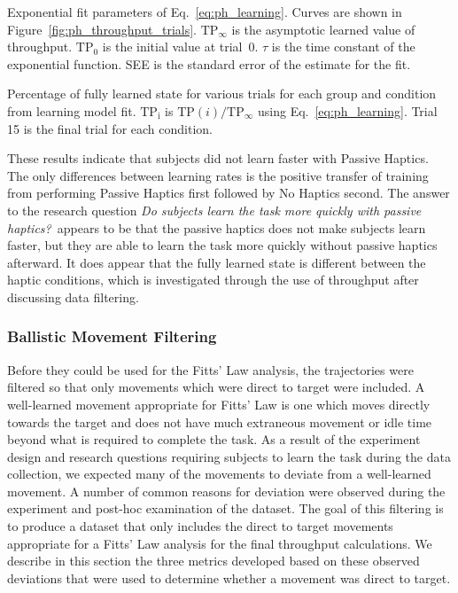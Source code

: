 \begin{table}
    \centering
    \caption{Exponential fit parameters of Eq.~\ref{eq:ph_learning}. Curves are shown in Figure~\ref{fig:ph_throughput_trials}. $\mathrm{TP}_{\infty}$ is the asymptotic learned value of throughput. $\mathrm{TP}_0$ is the initial value at trial~0. $\tau$ is the time constant of the exponential function. SEE is the standard error of the estimate for the fit.}
    \label{tab:ph_tp_regression}
\end{table}

\begin{table}
    \centering
    \caption{Percentage of fully learned state for various trials for each group and condition from learning model fit. $\mathrm{TP_i}$ is $\mathrm{TP}(i)/\mathrm{TP}_{\infty}$ using Eq.~\ref{eq:ph_learning}. Trial 15 is the final trial for each condition.}
    \label{tab:ph_tp_regression_values}
\end{table}

These results indicate that subjects did not learn faster with Passive Haptics.
The only differences between learning rates is the positive transfer of training from performing Passive Haptics first followed by No Haptics second.
The answer to the research question \textit{Do subjects learn the task more quickly with passive haptics?}\ appears to be that the passive haptics does not make subjects learn faster, but they are able to learn the task more quickly without passive haptics afterward.
It does appear that the fully learned state is different between the haptic conditions, which is investigated through the use of throughput after discussing data filtering.

\subsubsection{Ballistic Movement Filtering}
\label{sec:ph_ballistic_filter}

Before they could be used for the Fitts' Law analysis, the trajectories were filtered so that only movements which were direct to target were included.
A well-learned movement appropriate for Fitts' Law is one which moves directly towards the target and does not have much extraneous movement or idle time beyond what is required to complete the task.
As a result of the experiment design and research questions requiring subjects to learn the task during the data collection, we expected many of the movements to deviate from a well-learned movement.
A number of common reasons for deviation were observed during the experiment and post-hoc examination of the dataset.
The goal of this filtering is to produce a dataset that only includes the direct to target movements appropriate for a Fitts' Law analysis for the final throughput calculations.
We describe in this section the three metrics developed based on these observed deviations that were used to determine whether a movement was direct to target.


